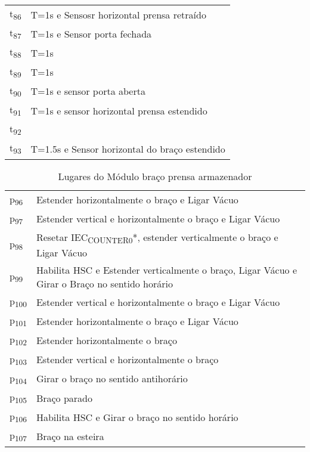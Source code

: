 \begin{center}
\begin{tabular}{ll}
t\textsubscript{86} & T=1s e Sensosr horizontal prensa retraído\\
t\textsubscript{87} & T=1s e Sensor porta fechada\\
t\textsubscript{88} & T=1s\\
t\textsubscript{89} & T=1s\\
t\textsubscript{90} & T=1s e sensor porta aberta\\
t\textsubscript{91} & T=1s e sensor horizontal prensa estendido\\
t\textsubscript{92} & \\
t\textsubscript{93} & T=1.5s e Sensor horizontal do braço estendido\\
\end{tabular}
\end{center}
\begin{table}[htbp]
\caption{Lugares do Módulo braço prensa armazenador}
\centering
\begin{tabular}{ll}
p\textsubscript{96} & Estender horizontalmente o braço e Ligar Vácuo\\
p\textsubscript{97} & Estender vertical e horizontalmente o braço e Ligar Vácuo\\
p\textsubscript{98} & Resetar IEC\textsubscript{COUNTER0}*, estender verticalmente o braço e Ligar Vácuo\\
p\textsubscript{99} & Habilita HSC e Estender verticalmente o braço, Ligar Vácuo e Girar o Braço no sentido horário\\
p\textsubscript{100} & Estender vertical e horizontalmente o braço e Ligar Vácuo\\
p\textsubscript{101} & Estender horizontalmente o braço e Ligar Vácuo\\
p\textsubscript{102} & Estender horizontalmente o braço\\
p\textsubscript{103} & Estender vertical e horizontalmente o braço\\
p\textsubscript{104} & Girar o braço no sentido antihorário\\
p\textsubscript{105} & Braço parado\\
p\textsubscript{106} & Habilita HSC e Girar o braço no sentido horário\\
p\textsubscript{107} & Braço na esteira\\
\end{tabular}
\end{table}

